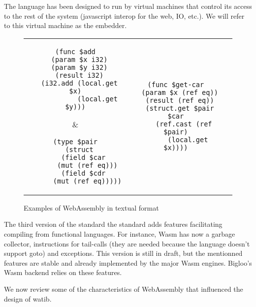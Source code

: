 \documentclass[10pt]{article}
\begin{document}
The language has been designed to run by virtual machines that control its
access to the rest of the system (javascript interop for the web, IO, etc.). We
will refer to this virtual machine as the embedder.
\begin{figure}[h]
\centering
\begin{tabular}{c c c}
\begin{minipage}{1.8in}
\begin{verbatim}
(func $add
  (param $x i32)
  (param $y i32)
  (result i32)
  (i32.add (local.get $x)
           (local.get $y)))
\end{verbatim}
\end{minipage}&
\begin{minipage}{1.6in}
\begin{verbatim}
(type $pair
  (struct
    (field $car
      (mut (ref eq)))
    (field $cdr
      (mut (ref eq)))))
\end{verbatim}
\end{minipage}
&\begin{minipage}{1.8in}
\begin{verbatim}
(func $get-car
  (param $x (ref eq))
  (result (ref eq))
  (struct.get $pair $car
    (ref.cast (ref $pair)
      (local.get $x))))
\end{verbatim}
\end{minipage}
\end{tabular}
\caption{Examples of WebAssembly in textual format}
\end{figure}

The third version of the standard the standard adds features facilitating
compiling from functional languages. For instance, Wasm has now a garbage
collector, instructions for tail-calls (they are needed because the language
doesn't support goto) and exceptions. This version is still in draft, but the
mentionned features are stable and already implemented by the major Wasm
engines. Bigloo's Wasm backend relies on these features.

We now review some of the characteristics of WebAssembly that influenced the
design of watib.
\end{document}
